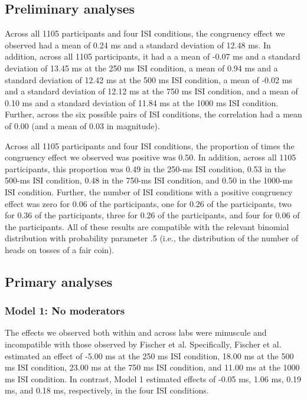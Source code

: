 \documentclass[man,floatsintext]{apa6}
\theoremstyle{definition}
\theoremstyle{definition}
\theoremstyle{definition}
\theoremstyle{remark}
\begin{document}
\subsection{Preliminary analyses}\label{preliminary-analyses}

Across all 1105 participants and four ISI conditions, the congruency
effect we observed had a mean of 0.24 ms and a standard deviation of
12.48 ms. In addition, across all 1105 participants, it had a a mean of
-0.07 ms and a standard deviation of 13.45 ms at the 250 ms ISI
condition, a mean of 0.94 ms and a standard deviation of 12.42 ms at the
500 ms ISI condition, a mean of -0.02 ms and a standard deviation of
12.12 ms at the 750 ms ISI condition, and a mean of 0.10 ms and a
standard deviation of 11.84 ms at the 1000 ms ISI condition. Further,
across the six possible pairs of ISI conditions, the correlation had a
mean of 0.00 (and a mean of 0.03 in magnitude).

Across all 1105 participants and four ISI conditions, the proportion of
times the congruency effect we observed was positive was 0.50. In
addition, across all 1105 participants, this proportion was 0.49 in the
250-ms ISI condition, 0.53 in the 500-ms ISI condition, 0.48 in the
750-ms ISI condition, and 0.50 in the 1000-ms ISI condition. Further,
the number of ISI conditions with a positive congruency effect was zero
for 0.06 of the participants, one for 0.26 of the participants, two for
0.36 of the participants, three for 0.26 of the participants, and four
for 0.06 of the participants. All of these results are compatible with
the relevant binomial distribution with probability parameter .5 (i.e.,
the distribution of the number of heads on tosses of a fair coin).

\subsection{Primary analyses}\label{primary-analyses}

\subsubsection{Model 1: No moderators}\label{model-1-no-moderators-1}

The effects we observed both within and across labs were minuscule and
incompatible with those observed by Fischer et al. Specifically, Fischer
et al. estimated an effect of -5.00 ms at the 250 ms ISI condition,
18.00 ms at the 500 ms ISI condition, 23.00 ms at the 750 ms ISI
condition, and 11.00 ms at the 1000 ms ISI condition. In contrast, Model
1 estimated effects of -0.05 ms, 1.06 ms, 0.19 ms, and 0.18 ms,
respectively, in the four ISI conditions.
\end{document}
